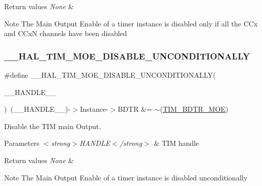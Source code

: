 \begin{DoxyRetVals}{Return values}
{\em None} & \\
\hline
\end{DoxyRetVals}
\begin{DoxyNote}{Note}
The Main Output Enable of a timer instance is disabled only if all the C\+Cx and C\+CxN channels have been disabled 
\end{DoxyNote}
\mbox{\label{group___t_i_m___exported___macros_gaa5c4053e8e57dc234efecbb698287b55}} 
\subsubsection{\texorpdfstring{\_\_HAL\_TIM\_MOE\_DISABLE\_UNCONDITIONALLY}{\_\_HAL\_TIM\_MOE\_DISABLE\_UNCONDITIONALLY}}
{\footnotesize\ttfamily \#define \+\_\+\+\_\+\+H\+A\+L\+\_\+\+T\+I\+M\+\_\+\+M\+O\+E\+\_\+\+D\+I\+S\+A\+B\+L\+E\+\_\+\+U\+N\+C\+O\+N\+D\+I\+T\+I\+O\+N\+A\+L\+LY(\begin{DoxyParamCaption}\item[{}]{\+\_\+\+\_\+\+H\+A\+N\+D\+L\+E\+\_\+\+\_\+ }\end{DoxyParamCaption})~(\+\_\+\+\_\+\+H\+A\+N\+D\+L\+E\+\_\+\+\_\+)-\/$>$Instance-\/$>$B\+D\+TR \&= $\sim$(\mbox{\hyperlink{group___peripheral___registers___bits___definition_ga277a096614829feba2d0a4fbb7d3dffc}{T\+I\+M\+\_\+\+B\+D\+T\+R\+\_\+\+M\+OE}})}



Disable the T\+IM main Output. 


\begin{DoxyParams}{Parameters}
{\em $<$strong$>$\+H\+A\+N\+D\+L\+E$<$/strong$>$} & T\+IM handle \\
\hline
\end{DoxyParams}

\begin{DoxyRetVals}{Return values}
{\em None} & \\
\hline
\end{DoxyRetVals}
\begin{DoxyNote}{Note}
The Main Output Enable of a timer instance is disabled unconditionally 
\end{DoxyNote}
\mbox{\label{group___t_i_m___exported___macros_ga04890dcef3ed061854721a3672585607}} 
